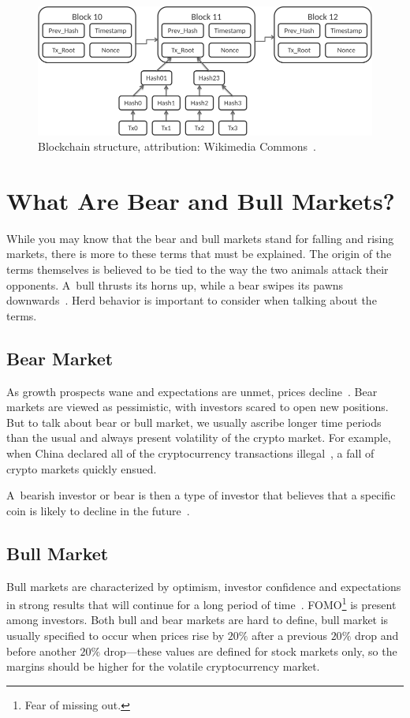 \begin{figure}[!hbt]
    \centering
    \includegraphics[width=\columnwidth]{figures/Bitcoin_Block_Data.png}
    \caption{Blockchain structure, attribution: Wikimedia Commons~\cite{wikimedia:blockchain}.}
    \label{blockchain-figure}
\end{figure}

\section{What Are Bear and Bull Markets?}
While you may know that the bear and bull markets stand for falling and rising markets, there is more to these terms that must be explained. The origin of the terms themselves is believed to be tied to the way the two animals attack their opponents. A~bull thrusts its horns up, while a bear swipes its pawns downwards~\cite{investopedia-bull-market}.
Herd behavior is important to consider when talking about the terms.

\subsection*{Bear Market}
As growth prospects wane and expectations are unmet, prices decline~\cite{investopedia-bear-market}. Bear markets are viewed as pessimistic, with investors scared to open new positions. But to talk about bear or bull market, we usually ascribe longer time periods than the usual and always present volatility of the crypto market. For example, when China declared all of the cryptocurrency transactions illegal~\cite{china-ban}, a fall of crypto markets quickly ensued.

A~bearish investor or bear is then a type of investor that believes that a specific coin is likely to decline in the future~\cite{investopedia-bull}.

\subsection*{Bull Market}
Bull markets are characterized by optimism, investor confidence and expectations in strong results that will continue for a long period of time~\cite{investopedia-bull-market}. FOMO\footnote{Fear of missing out.} is present among investors. Both bull and bear markets are hard to define, bull market is usually specified to occur when prices rise by $20\%$ after a previous $20\%$ drop and before another $20\%$ drop---these values are defined for stock markets only, so the margins should be higher for the volatile cryptocurrency market.

